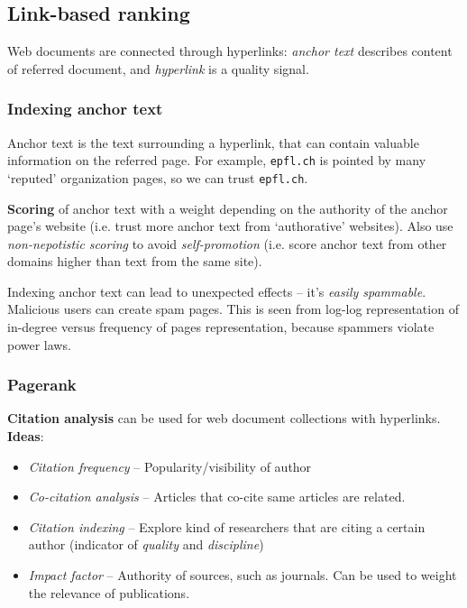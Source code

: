 \subsection{Link-based ranking} %
\label{sub:link_based_ranking}
  Web documents are connected through hyperlinks: \emph{anchor text} describes content of referred document, and \emph{hyperlink} is a quality signal.

  \subsubsection{Indexing anchor text} %
  \label{ssub:indexing_anchor_text}
    Anchor text is the text surrounding a hyperlink, that can contain valuable information on the referred page. For example, \texttt{epfl.ch} is pointed by many `reputed' organization pages, so we can trust \texttt{epfl.ch}.

    \textbf{Scoring} of anchor text with a weight depending on the authority of the anchor page's website (i.e. trust more anchor text from `authorative' websites). Also use \emph{non-nepotistic scoring} to avoid \emph{self-promotion} (i.e. score anchor text from other domains higher than text from the same site).

    Indexing anchor text can lead to unexpected effects -- it's \emph{easily spammable}. Malicious users can create spam pages. This is seen from log-log representation of in-degree versus frequency of pages representation, because spammers violate power laws.

  \subsubsection{Pagerank} %
  \label{ssub:link_based_ranking_pagerank}
    \textbf{Citation analysis} can be used for web document collections with hyperlinks. \textbf{Ideas}:
    \begin{itemize}
      \item \emph{Citation frequency} -- Popularity/visibility of author
      \item \emph{Co-citation analysis} -- Articles that co-cite same articles are related.
      \item \emph{Citation indexing} -- Explore kind of researchers that are citing a certain author (indicator of \emph{quality} and \emph{discipline})
      \item \emph{Impact factor} -- Authority of sources, such as journals. Can be used to weight the relevance of publications.
    \end{itemize}

